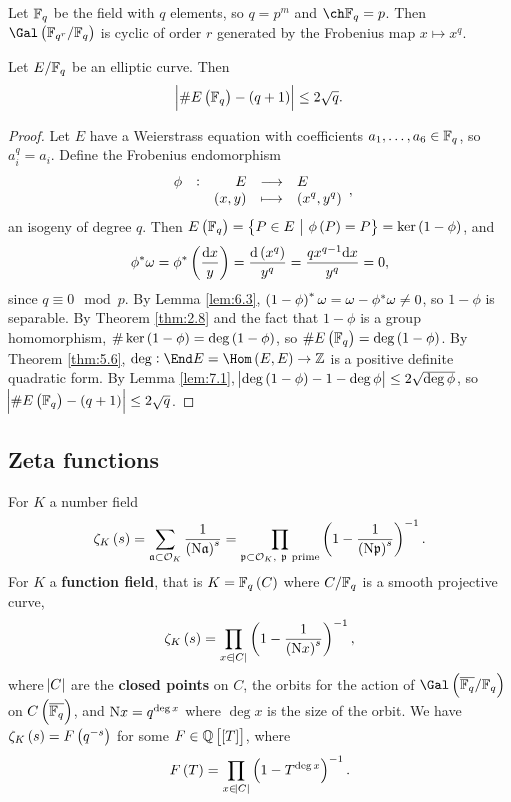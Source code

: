 Let $ \mathbb{F}_q $ be the field with $ q $ elements, so $ q = p^m $ and $ \ch \FF_q = p $. Then $ \Gal\br{\FF_{q^r} / \FF_q} $ is cyclic of order $ r $ generated by the Frobenius map $ x \mapsto x^q $.

\begin{theorem}[Hasse]
Let $ E / \mathbb{F}_q $ be an elliptic curve. Then
$$ \abs{\#E\br{\FF_q} - \br{q + 1}} \le 2\sqrt{q}. $$
\end{theorem}

\begin{proof}
Let $ E $ have a Weierstrass equation with coefficients $ a_1, \dots, a_6 \in \mathbb{F}_q $, so $ a_i^q = a_i $. Define the Frobenius endomorphism
$$ \function[\phi]{E}{E}{\br{x, y}}{\br{x^q, y^q}}, $$
an isogeny of degree $ q $. Then $ E\br{\FF_q} = \cbr{P \in E \st \phi\br{P} = P} = \ker \br{1 - \phi} $, and
$$ \phi^*\omega = \phi^*\br{\dfrac{\d x}{y}} = \dfrac{\d\br{x^q}}{y^q} = \dfrac{qx^{q - 1}\d x}{y^q} = 0, $$
since $ q \equiv 0 \mod p $. By Lemma \ref{lem:6.3}, $ \br{1 - \phi}^*\omega = \omega - \phi^*\omega \ne 0 $, so $ 1 - \phi $ is separable. By Theorem \ref{thm:2.8} and the fact that $ 1 - \phi $ is a group homomorphism, $ \#\ker \br{1 - \phi} = \deg \br{1 - \phi} $, so $ \#E\br{\FF_q} = \deg \br{1 - \phi} $. By Theorem \ref{thm:5.6}, $ \deg : \End E = \Hom\br{E, E} \to \ZZ $ is a positive definite quadratic form. By Lemma \ref{lem:7.1}, $ \abs{\deg \br{1 - \phi} - 1 - \deg \phi} \le 2\sqrt{\deg \phi} $, so $ \abs{\#E\br{\FF_q} - \br{q + 1}} \le 2\sqrt{q} $.
\end{proof}

\subsection{Zeta functions}

For $ K $ a number field
$$ \zeta_K\br{s} = \sum_{\aaa \subset \OOO_K} \dfrac{1}{\br{\N\aaa}^s} = \prod_{\ppp \subset \OOO_K, \ \ppp \ \text{prime}} \br{1 - \dfrac{1}{\br{\N\ppp}^s}}^{-1}. $$
For $ K $ a \textbf{function field}, that is $ K = \FF_q\br{C} $ where $ C / \mathbb{F}_q $ is a smooth projective curve,
$$ \zeta_K\br{s} = \prod_{x \in \abs{C}} \br{1 - \dfrac{1}{\br{\N x}^s}}^{-1}, $$
where $ \abs{C} $ are the \textbf{closed points} on $ C $, the orbits for the action of $ \Gal\br{\overline{\FF_q} / \FF_q} $ on $ C\br{\overline{\FF_q}} $, and $ \mathrm{N} x = q^{\deg x} $ where $ \deg x $ is the size of the orbit. We have $ \zeta_K\br{s} = F\br{q^{-s}} $ for some $ F \in \QQ\sbr{\sbr{T}} $, where
$$ F\br{T} = \prod_{x \in \abs{C}} \br{1 - T^{\deg x}}^{-1}. $$

